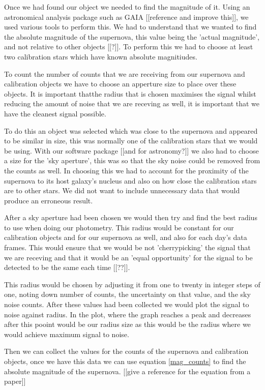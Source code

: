 \documentclass[twocolumn]{revtex4}
\begin{document}
Once we had found our object we needed to find the magnitude of it. Using an astronomical analysis package such as GAIA [[reference and improve this]], we used various tools to perform this. We had to understand that we wanted to find the absolute magnitude of the supernova, this value being the 'actual magnitude', and not relative to other objects [[?]]. To perform this we had to choose at least two calibration stars which have known absolute magnitiudes.

To count the number of counts that we are receiving from our supernova and calibration objects we have to choose an apperture size to place over these objects. It is important thatthe radius that is chosen maximises the signal whilst reducing the amount of noise that we are receving as well, it is important that we have the cleanest signal possible.

To do this an object was selected which was close to the supernova and appeared to be similar in size, this was normally one of the calibration stars that we would be using. With our software package [[and for astronomy?]] we also had to choose a size for the 'sky aperture', this was so that the sky noise could be removed from the counts as well. In choosing this we had to account for the proximity of the supernova to its host galaxy's nucleus and also on how close the calibration stars are to other stars. We did not want to include unnecessary data that would produce an erroneous result. 

After a sky aperture had been chosen we would then try and find the best radius to use when doing our photometry. This radius would be constant for our calibration objects and for our supernova as well, and also for each day's data frames. This would ensure that we would be not 'cherrypicking' the signal that we are receving and that it would be an 'equal opportunity' for the signal to be detected to be the same each time [[??]]. 

This radius would be chosen by adjusting it from one to twenty in integer steps of one, noting down number of counts, the uncertainty on that value, and the sky noise counts. After these values had been collected we would plot the signal to noise against radius. In the plot, where the graph reaches a peak and decreases after this pooint would be our radius size as this would be the radius where we would achieve maximum signal to noise.

Then we can collect the values for the counts of the supernova and calibration objects, once we have this data we can use equation \ref{mag_counts} to find the absolute magnitude of the supernova. [[give a reference for the equation from a paper]]
\end{document}
